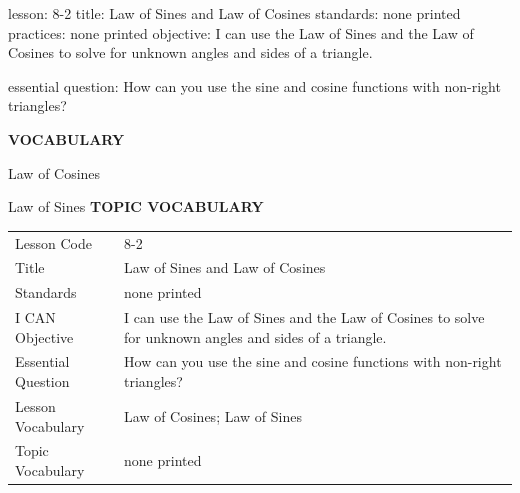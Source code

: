 \documentclass{article}
\newenvironment{lesson-meta}{}{}        %
\newcommand{\te}[1]{}                   %
\begin{document}
\begin{lesson-meta}
lesson: 8-2
title: Law of Sines and Law of Cosines
standards: none printed
practices: none printed
objective: I can use the Law of Sines and the Law of Cosines to solve for unknown angles and sides of a triangle.

essential question: How can you use the sine and cosine functions with non-right triangles?

\textbf{VOCABULARY}
\item Law of Cosines
\item Law of Sines
\textbf{TOPIC VOCABULARY}
\te{No topic vocabulary list is printed on these pages.}
\begin{tabular}{ll}
Lesson Code & 8-2 \\
Title & Law of Sines and Law of Cosines \\
Standards & none printed \\
I CAN Objective & I can use the Law of Sines and the Law of Cosines to solve for unknown angles and sides of a triangle. \\
Essential Question & How can you use the sine and cosine functions with non-right triangles? \\
Lesson Vocabulary & Law of Cosines; Law of Sines \\
Topic Vocabulary & none printed \\
\end{tabular}
\end{lesson-meta}
\end{document}
